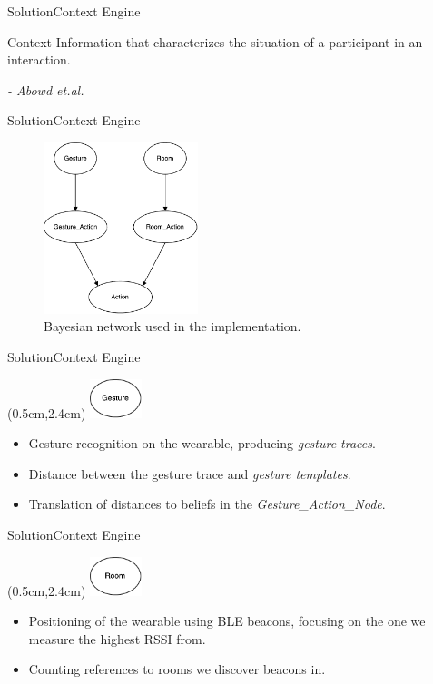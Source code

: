 \begin{frame}{Solution}{Context Engine}
\begin{block}{Context}
Information that characterizes the situation of a participant in an interaction.

\textit{- Abowd et.al.}
\end{block}
\end{frame}

\begin{frame}{Solution}{Context Engine}
\begin{figure}[h]
\centering
\includegraphics[width=0.4\textwidth]{../images/bayesian-network-simple}
\caption{Bayesian network used in the implementation.}
\end{figure}
\end{frame}

\begin{frame}{Solution}{Context Engine}
\begin{textblock*}{1.5cm}(0.5cm,2.4cm)
\includegraphics[width=1.5cm]{../images/bayesian-network-gesture-node}
\end{textblock*}
\begin{itemize}
\item Gesture recognition on the wearable, producing \emph{gesture traces}.
\item Distance between the gesture trace and \emph{gesture templates}.
\item Translation of distances to beliefs in the \emph{Gesture\_Action\_Node}. 
\end{itemize}
\end{frame}

\begin{frame}{Solution}{Context Engine}
\begin{textblock*}{1.5cm}(0.5cm,2.4cm)
\includegraphics[width=1.5cm]{../images/bayesian-network-room-node}
\end{textblock*}
\begin{itemize}
\item Positioning of the wearable using BLE beacons, focusing on the one we measure the highest RSSI from.
\item Counting references to rooms we discover beacons in.
\end{itemize}
\end{frame}

